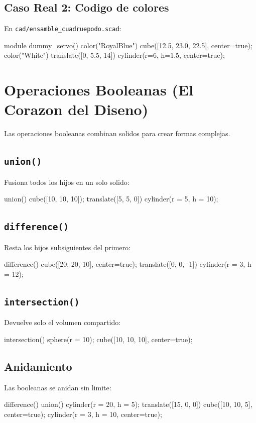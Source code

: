 \documentclass[12pt, oneside, a4paper]{report}
\newcommand{\codigo}[1]{\texttt{#1}}
\begin{document}
\section{Caso Real 2: Codigo de colores}
En \codigo{cad/ensamble\_cuadruepodo.scad}:
\begin{openscad}
module dummy_servo() {
    color("RoyalBlue") {
        cube([12.5, 23.0, 22.5], center=true);
    }
    color("White") {
        translate([0, 5.5, 14])
            cylinder(r=6, h=1.5, center=true);
    }
}
\end{openscad}

\chapter{Operaciones Booleanas (El Corazon del Diseno)}

Las operaciones booleanas combinan solidos para crear formas complejas.

\section{\codigo{union()}}
Fusiona todos los hijos en un solo solido:
\begin{openscad}
union() {
    cube([10, 10, 10]);
    translate([5, 5, 0])
        cylinder(r = 5, h = 10);
}
\end{openscad}

\section{\codigo{difference()}}
Resta los hijos subsiguientes del primero:
\begin{openscad}
difference() {
    cube([20, 20, 10], center=true);
    translate([0, 0, -1])
        cylinder(r = 3, h = 12);
}
\end{openscad}

\section{\codigo{intersection()}}
Devuelve solo el volumen compartido:
\begin{openscad}
intersection() {
    sphere(r = 10);
    cube([10, 10, 10], center=true);
}
\end{openscad}

\section{Anidamiento}
Las booleanas se anidan sin limite:
\begin{openscad}
difference() {
    union() {
        cylinder(r = 20, h = 5);
        translate([15, 0, 0])
            cube([10, 10, 5], center=true);
    }
    cylinder(r = 3, h = 10, center=true);
}
\end{openscad}
\end{document}
